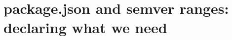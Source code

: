 \chapter{package.json and semver ranges: declaring what we need}
\label{ch:package-json-and-semver-ranges}

